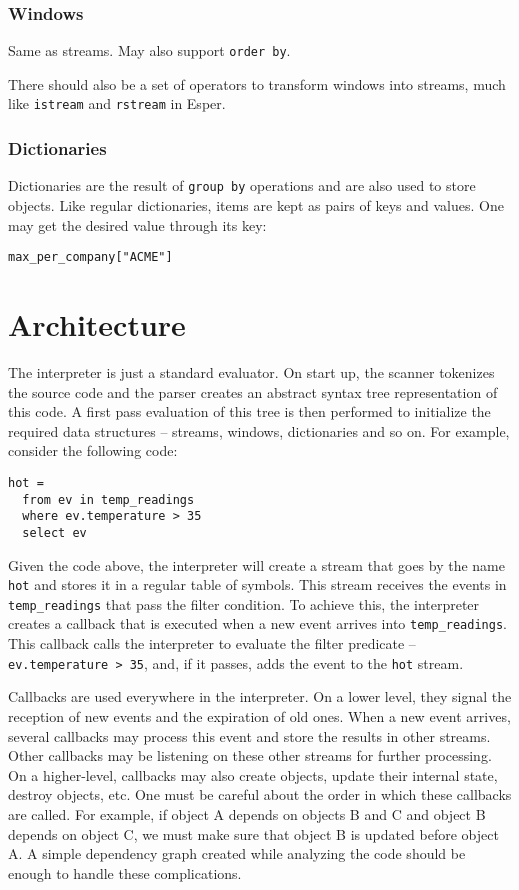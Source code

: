 \documentclass{report}
\begin{document}
\subsection{Windows}

Same as streams. May also support \verb=order by=.

There should also be a set of operators to transform windows into
streams, much like \verb=istream= and \verb=rstream= in Esper.

\subsection{Dictionaries}

Dictionaries are the result of \verb=group by= operations and are also
used to store objects. Like regular dictionaries, items are kept as
pairs of keys and values. One may get the desired value through its
key:

\begin{verbatim}
max_per_company["ACME"]
\end{verbatim}

\chapter{Architecture}

The interpreter is just a standard evaluator. On start up, the scanner
tokenizes the source code and the parser creates an abstract syntax
tree representation of this code. A first pass evaluation of this tree
is then performed to initialize the required data structures --
streams, windows, dictionaries and so on. For example, consider the
following code:

\begin{verbatim}
hot =
  from ev in temp_readings
  where ev.temperature > 35
  select ev
\end{verbatim}

Given the code above, the interpreter will create a stream that goes
by the name \verb=hot= and stores it in a regular table of
symbols. This stream receives the events in \verb=temp_readings= that
pass the filter condition. To achieve this, the interpreter creates a
callback that is executed when a new event arrives into
\verb=temp_readings=. This callback calls the interpreter to evaluate
the filter predicate -- \verb=ev.temperature > 35=, and, if it passes,
adds the event to the \verb=hot= stream.

Callbacks are used everywhere in the interpreter. On a lower level,
they signal the reception of new events and the expiration of old
ones. When a new event arrives, several callbacks may process this
event and store the results in other streams. Other callbacks may be
listening on these other streams for further processing. On a
higher-level, callbacks may also create objects, update their internal
state, destroy objects, etc. One must be careful about the order in
which these callbacks are called. For example, if object A depends on
objects B and C and object B depends on object C, we must make sure
that object B is updated before object A. A simple dependency graph
created while analyzing the code should be enough to handle these
complications.
\end{document}
